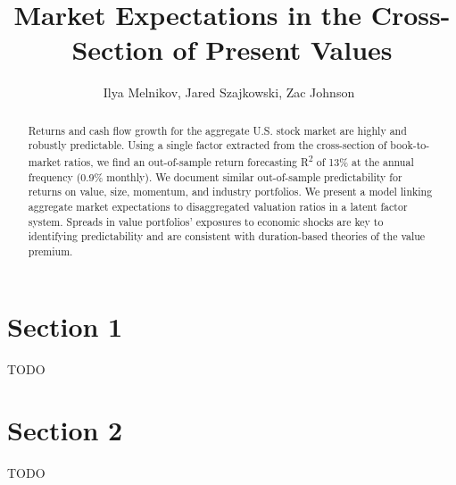 \documentclass[12pt]{article}
\begin{document}
\title{
Market Expectations in the Cross-Section of Present Values
}

\author{
Ilya Melnikov, Jared Szajkowski, Zac Johnson\
}
\begin{titlepage}
\maketitle

\doublespacing
\begin{abstract}
    Returns and cash flow growth for the aggregate U.S. stock market are highly and robustly predictable. 
    Using a single factor extracted from the cross-section of book-to-market ratios, 
    we find an out-of-sample return forecasting R\textsuperscript{2} of 13\% at the annual frequency (0.9\% monthly). 
    We document similar out-of-sample predictability for returns on value, size, momentum, and industry portfolios. 
    We present a model linking aggregate market expectations to disaggregated valuation ratios in a latent factor system. 
    Spreads in value portfolios’ exposures to economic shocks are key to identifying predictability and are consistent 
    with duration-based theories of the value premium.
\end{abstract}

\end{titlepage}



\doublespacing
\section{Section 1}

TODO




\doublespacing
\section{Section 2}

TODO
\end{document}
